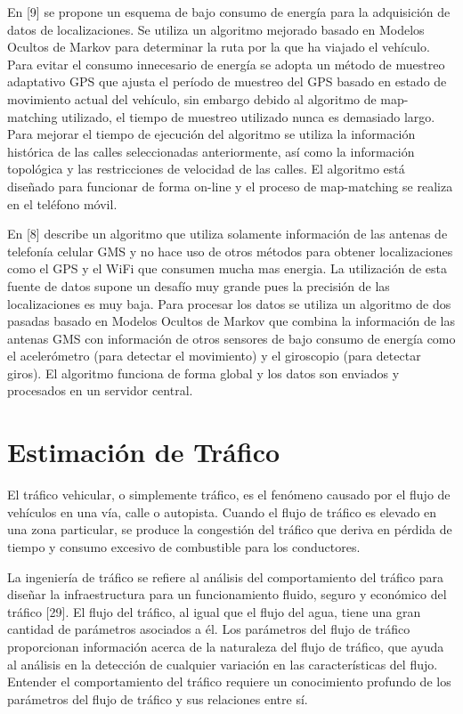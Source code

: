 \documentclass[final,fmstyle]{fpunathesis}
\begin{document}
En [9] se propone un esquema de bajo consumo de energía para la adquisición de datos de localizaciones. Se utiliza un algoritmo mejorado basado en Modelos Ocultos de Markov para determinar la ruta por la que ha viajado el vehículo. Para evitar el consumo innecesario de energía se adopta un método de muestreo adaptativo GPS que ajusta el período de muestreo del GPS basado en estado de movimiento actual del vehículo, sin embargo debido al algoritmo de map-matching utilizado, el tiempo de muestreo utilizado nunca es demasiado largo. Para mejorar el tiempo de ejecución del algoritmo se utiliza la información histórica de las calles seleccionadas anteriormente, así como la información topológica y las restricciones de velocidad de las calles. El algoritmo está diseñado para funcionar de forma on-line y el proceso de map-matching se realiza en el teléfono móvil.

En [8] describe un algoritmo que utiliza solamente información de las antenas de telefonía celular GMS y no hace uso de otros métodos para obtener localizaciones como el GPS y el WiFi que consumen mucha mas energia. La utilización de esta fuente de datos supone un desafío muy grande pues la precisión de las localizaciones es muy baja. Para procesar los datos se utiliza un algoritmo de dos pasadas basado en Modelos Ocultos de Markov que combina la información de las antenas GMS con información de otros sensores de bajo consumo de energía como el acelerómetro (para detectar el movimiento) y el giroscopio (para detectar giros). El algoritmo funciona de forma global y los datos son enviados y procesados en un servidor central.

\chapter{Estimación de Tráfico}

El tráfico vehicular, o simplemente tráfico, es el fenómeno causado por el flujo de vehículos en una vía, calle o autopista. Cuando el flujo de tráfico es elevado en una zona particular, se produce la congestión del tráfico que deriva en pérdida de tiempo y consumo excesivo de combustible para los conductores.

La ingeniería de tráfico se refiere al análisis del comportamiento del tráfico para diseñar la infraestructura para un funcionamiento fluido, seguro y económico del tráfico [29]. El flujo del tráfico, al igual que el flujo del agua, tiene una gran cantidad de parámetros asociados a él. Los parámetros del flujo de tráfico proporcionan información acerca de la naturaleza del flujo de tráfico, que ayuda al análisis en la detección de cualquier variación en las características del flujo. Entender el comportamiento del tráfico requiere un conocimiento profundo de los parámetros del flujo de tráfico y sus relaciones entre sí.
\end{document}

